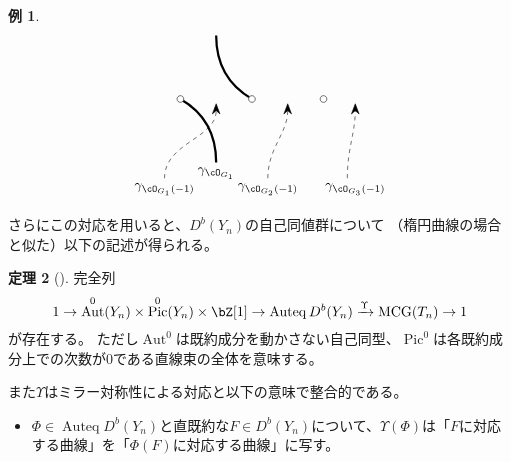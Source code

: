 \documentclass[uplatex,11pt,a4paper,dvipdfmx]{jsarticle}
\numberwithin{equation}{section}
\theoremstyle{definition}
\newtheorem{theorem}{定理}[section]
\newtheorem{example}[theorem]{例}
\DeclareMathOperator{\Auteq}{\mathrm{Auteq}}
\DeclareMathOperator{\Pic}{\mathrm{Pic}}
\DeclareMathOperator{\MCG}{\mathrm{MCG}}
\DeclareMathOperator{\Aut}{\mathrm{Aut}}
\begin{document}
\begin{example}
\begin{displaymath}
\begin{tikzpicture}[scale = 0.4]
            \draw[ultra thick] (8, 4) to[out=-30,in=90] (10.25, 0);
            \draw[ultra thick] (10.25, 8) to[out=-90,in=150] (12.5, 4);
            \draw(10.25, 0) node[below]{$\gamma_{\cO_{G_1}}$};
            \foreach \u in {8, 12.5, 17}
                {
                    \filldraw[white] (\u, 4) circle (6pt);
                    \draw[black] (\u, 4) circle (6pt);
                }

            \draw[dashed, -{Stealth[length=3mm]}] (7, -1) to[out=90, in=-90] (10.25, 3.75);
            \draw(7, -1) node[below]{$\gamma_{\cO_{G_1}(-1)}$};
            \draw[dashed, -{Stealth[length=3mm]}] (13.5, -1) to[out=90, in=-90] (14.75, 3.75);
            \draw(13.5, -1) node[below]{$\gamma_{\cO_{G_2}(-1)}$};
            \draw[dashed, -{Stealth[length=3mm]}] (18.5, -1) to[out=90, in=-90] (19, 3.75);
            \draw(19, -1) node[below]{$\gamma_{\cO_{G_3}(-1)}$};




        \end{tikzpicture}
    \end{displaymath}
\end{example}
さらにこの対応を用いると、$D^b(Y_n)$の自己同値群について
（楕円曲線の場合と似た）以下の記述が得られる。
\begin{theorem}[{\cite[Theorem D]{2020arXiv201108288O}}]\label{auteq_of_kodaira_fiber}
    完全列
    \begin{equation}
        1 \to \Aut^0(Y_n) \times \Pic^0(Y_n)\times \bZ[1] \to \Auteq{D^b(Y_n)} \xrightarrow{\Upsilon} \MCG(T_n) \to 1
    \end{equation}
    が存在する。
    ただし$\Aut^0$は既約成分を動かさない自己同型、$\Pic^0$は各既約成分上での次数が$0$である直線束の全体を意味する。

    また$\Upsilon$はミラー対称性による対応と以下の意味で整合的である。
    \begin{itemize}
        \item $\Phi \in \Auteq{D^b(Y_n)}$と直既約な$F \in D^b(Y_n)$について、$\Upsilon(\Phi)$は「$F$に対応する曲線」を「$\Phi(F)$に対応する曲線」に写す。
    \end{itemize}
\end{theorem}
\end{document}
